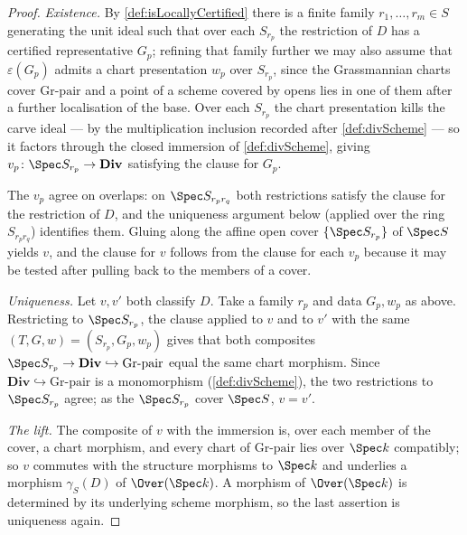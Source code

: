 \begin{proof}
  \leanok
  \emph{Existence.} By \ref{def:isLocallyCertified} there is a finite family
  \(r_1,\dots,r_m \in S\) generating the unit ideal such that over each \(S_{r_p}\) the
  restriction of \(D\) has a certified representative \(G_p\); refining that family further
  we may also assume that \(\varepsilon(G_p)\) admits a chart presentation \(w_p\) over
  \(S_{r_p}\), since the Grassmannian charts cover \(\mathrm{Gr}\text{-pair}\) and a point
  of a scheme covered by opens lies in one of them after a further localisation of the
  base. Over each \(S_{r_p}\) the chart presentation kills the carve ideal --- by the
  multiplication inclusion recorded after \ref{def:divScheme} --- so it factors through the
  closed immersion of \ref{def:divScheme}, giving \(v_p \colon \Spec S_{r_p} \to
  \mathbf{Div}\) satisfying the clause for \(G_p\).

  The \(v_p\) agree on overlaps: on \(\Spec S_{r_p r_q}\) both restrictions satisfy the
  clause for the restriction of \(D\), and the uniqueness argument below (applied over the
  ring \(S_{r_p r_q}\)) identifies them. Gluing along the affine open cover \(\{\Spec
  S_{r_p}\}\) of \(\Spec S\) yields \(v\), and the clause for \(v\) follows from the clause
  for each \(v_p\) because it may be tested after pulling back to the members of a cover.

  \emph{Uniqueness.} Let \(v, v'\) both classify \(D\). Take a family \(r_p\) and data
  \(G_p, w_p\) as above. Restricting to \(\Spec S_{r_p}\), the clause applied to \(v\) and
  to \(v'\) with the same \((T, G, w) = (S_{r_p}, G_p, w_p)\) gives that both composites
  \(\Spec S_{r_p} \to \mathbf{Div} \hookrightarrow \mathrm{Gr}\text{-pair}\) equal the same
  chart morphism. Since \(\mathbf{Div} \hookrightarrow \mathrm{Gr}\text{-pair}\) is a
  monomorphism (\ref{def:divScheme}), the two restrictions to \(\Spec S_{r_p}\) agree; as
  the \(\Spec S_{r_p}\) cover \(\Spec S\), \(v = v'\).

  \emph{The lift.} The composite of \(v\) with the immersion is, over each member of the
  cover, a chart morphism, and every chart of \(\mathrm{Gr}\text{-pair}\) lies over
  \(\Spec k\) compatibly; so \(v\) commutes with the structure morphisms to \(\Spec k\) and
  underlies a morphism \(\gamma_S(D)\) of \(\Over(\Spec k)\). A morphism of
  \(\Over(\Spec k)\) is determined by its underlying scheme morphism, so the last assertion
  is uniqueness again.
\end{proof}

